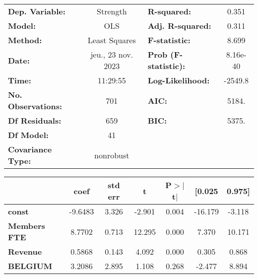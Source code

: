 \documentclass[ 11pt]{article}
\begin{document}
 \newpage
 \begin{center}
\begin{tabular}{lclc}
\toprule
\textbf{Dep. Variable:}                                &      Strength      & \textbf{  R-squared:         } &     0.351   \\
\textbf{Model:}                                        &        OLS         & \textbf{  Adj. R-squared:    } &     0.311   \\
\textbf{Method:}                                       &   Least Squares    & \textbf{  F-statistic:       } &     8.699   \\
\textbf{Date:}                                         & jeu., 23 nov. 2023 & \textbf{  Prob (F-statistic):} &  8.16e-40   \\
\textbf{Time:}                                         &      11:29:55      & \textbf{  Log-Likelihood:    } &   -2549.8   \\
\textbf{No. Observations:}                             &          701       & \textbf{  AIC:               } &     5184.   \\
\textbf{Df Residuals:}                                 &          659       & \textbf{  BIC:               } &     5375.   \\
\textbf{Df Model:}                                     &           41       & \textbf{                     } &             \\
\textbf{Covariance Type:}                              &     nonrobust      & \textbf{                     } &             \\
\bottomrule
\end{tabular}
\begin{tabular}{lcccccc}
                                                       & \textbf{coef} & \textbf{std err} & \textbf{t} & \textbf{P$> |$t$|$} & \textbf{[0.025} & \textbf{0.975]}  \\
\midrule
\textbf{const}                                         &      -9.6483  &        3.326     &    -2.901  &         0.004        &      -16.179    &       -3.118     \\
\textbf{Members FTE}                                   &       8.7702  &        0.713     &    12.295  &         0.000        &        7.370    &       10.171     \\
\textbf{Revenue}                                       &       0.5868  &        0.143     &     4.092  &         0.000        &        0.305    &        0.868     \\
\textbf{BELGIUM}                                       &       3.2086  &        2.895     &     1.108  &         0.268        &       -2.477    &        8.894     \\

\end{tabular}
\end{center}
\end{document}

